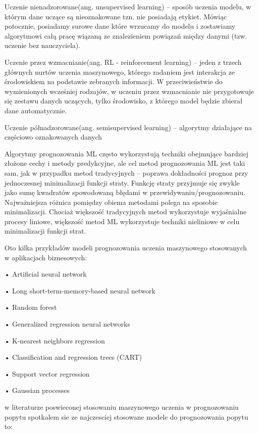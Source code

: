 Uczenie nienadzorowane(ang. unsupervised learning) – sposób uczenia modelu, w którym dane uczące są nieoznakowane tzn. nie posiadają etykiet. Mówiąc potocznie, posiadamy surowe dane które wrzucamy do modelu i zostawiamy algorytmowi całą pracę wiązaną ze znalezieniem powiązań między danymi (tzw. uczenie bez nauczyciela).

Uczenie przez wzmacnianie(ang. RL - reinforcement learning) – jeden z trzech głównych nurtów uczenia maszynowego, którego zadaniem jest interakcja ze środowiskiem na podstawie zebranych informacji. W przeciwieństwie do wymienionych wcześniej rodzajów, w uczeniu przez wzmacnianie nie przygotowuje się zestawu danych uczących, tylko środowisko, z którego model będzie zbierał dane automatycznie. 

  Uczenie półnadzorowane(ang. semisupervised learning) – algorytmy działające na częściowo oznakowanych danych\cite{gove2023}

 Algorytmy prognozowania ML często wykorzystują techniki obejmujące bardziej złożone cechy i metody predykcyjne, ale cel metod prognozowania ML jest taki sam, jak w przypadku metod tradycyjnych – poprawa dokładności prognoz przy jednoczesnej minimalizacji funkcji straty. Funkcję straty przyjmuje się zwykle jako sumę kwadratów spowodowaną błędami w przewidywaniu/prognozowaniu. Najważniejsza różnica pomiędzy obiema metodami polega na sposobie minimalizacji. Chociaż większość tradycyjnych metod wykorzystuje wyjaśnialne procesy liniowe, większość metod ML wykorzystuje techniki nieliniowe w celu minimalizacji funkcji strat. 



Oto kilka przykładów modeli prognozowania uczenia maszynowego stosowanych w aplikacjach biznesowych:

    • Artificial neural network
    
    • Long short-term-memory-based neural network
    
    • Random forest
    
    • Generalized regression neural networks
    
    • K-nearest neighbors regression
    
    • Classification and regression trees (CART)
    
    • Support vector regression
    
    • Gaussian processes 
\cite{gen2023}


w literaturze poswieconej stosowaniu maszynowego uczenia w prognozowaniu popytu spotkalem sie ze najczesciej stosowane modele do prognozowania popytu to:


